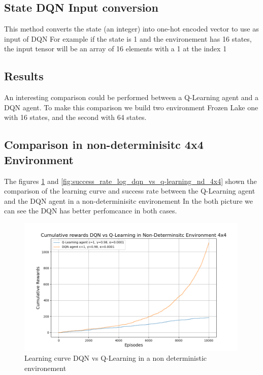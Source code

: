     \subsection{State DQN Input conversion}
    This method converts the state (an integer) into one-hot encoded vector to use as input of DQN
    For example if the state is 1 and the environement has 16 states, the input tensor will be an array
    of 16 elements with a 1 at the index 1
\subsection{Results}
An interesting comparison could be performed between a Q-Learning agent and a DQN agent.
To make this comparison we build two environment Frozen Lake one with 16 states, and the second with 64 states.
\subsection{Comparison in non-determinisitc 4x4 Environment}
The figures \ref{fig:cumulative_rewards_dqn_vs_q_learning_nd_4x4} and \ref{fig:success_rate_log_dqn_vs_q-learning_nd_4x4} shown the comparison of the learning curve and success rate between the Q-Learning agent and the DQN agent in a non-determinisitc environement
In the both picture we can see the DQN has better perfomcance in both cases.
\begin{figure}[H]
    \centering
    \includegraphics[width=0.99\textwidth]{images/cumulative_rewards_dqn_vs_q_learning_nd_4x4.png}
    \caption{Learning curve DQN vs Q-Learning in a non deterministic environement}
    \label{fig:cumulative_rewards_dqn_vs_q_learning_nd_4x4}
\end{figure}
